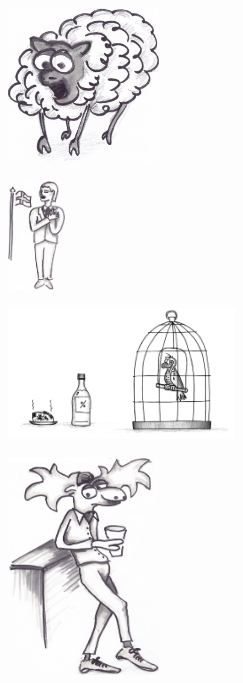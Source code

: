 \clearpage

\clearpage

\begin{figure}[!b]
\begin{center}
\includegraphics[width=4cm]{../bilder/far.jpg} 
\end{center}
\end{figure}
\clearpage


\clearpage

\begin{figure}[!b]
\begin{center}
\includegraphics[width=15mm]{../bilder/finland.jpg} 
\end{center}
\end{figure}
\clearpage

\clearpage

\clearpage

\begin{figure}[!b]
\begin{center}
\includegraphics[width=6cm]{../bilder/undulaten.png} 
\end{center}
\end{figure}
\clearpage

\clearpage

\clearpage



\begin{figure}[!b]
\begin{center}
\includegraphics[width=40mm]{../bilder/alg.jpg} 
\end{center}
\end{figure}
\clearpage

\clearpage


\clearpage

